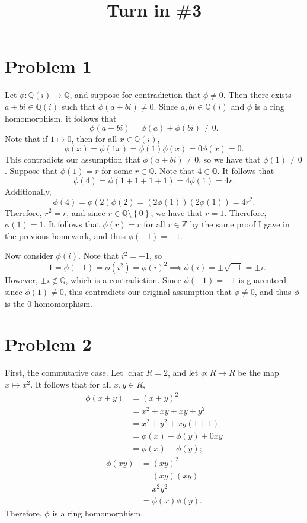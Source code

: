 \documentclass[11pt, letterpaper]{article}
\title{Turn in \#3}
\begin{document}
\makeproblem
\section*{Problem 1}
Let $\phi : \mathbb{Q} (i) \to \mathbb{Q} $, and suppose for contradiction that $\phi \neq 0$. Then there exists $a+bi\in\mathbb{Q}(i)$ such that $\phi (a+bi)\neq 0$. Since $a,bi\in\mathbb{Q} (i)$ and $\phi $ is a ring homomorphism, it follows that
\[
	\phi (a+bi)=\phi (a)+\phi (bi)\neq 0
.\]
Note that if $1\mapsto 0$, then for all $x\in\mathbb{Q} (i)$,
\[
	\phi (x)=\phi (1x)=\phi (1)\phi (x)=0\phi (x)=0
.\]
This contradicts our assumption that $\phi (a+bi)\neq 0$, so we have that $\phi (1)\neq 0$. Suppose that $\phi (1)=r$ for some $r\in\mathbb{Q} $. Note that $4\in\mathbb{Q} $. It follows that
\[
	\phi (4)=\phi (1+1+1+1)=4\phi (1)=4r
.\]
Additionally,
\[
	\phi (4)=\phi (2)\phi (2)=(2\phi (1))(2\phi (1))=4r^2
.\]
Therefore, $r^2=r$, and since $r\in\mathbb{Q} \setminus \left\{ 0 \right\} $, we have that $r=1$. Therefore, $\phi (1)=1$. It follows that $\phi (r)=r$ for all $r\in\mathbb{Z} $ by the same proof I gave in the previous homework, and thus $\phi (-1)=-1$.

Now consider $\phi (i)$. Note that $i^2=-1$, so
\[
	-1=\phi (-1)=\phi (i^2)=\phi (i)^2\implies \phi (i)=\pm\sqrt{-1} =\pm i
.\]
However, $\pm i\notin \mathbb{Q} $, which is a contradiction. Since $\phi (-1)=-1$ is guarenteed since $\phi (1)\neq 0$, this contradicts our original assumption that $\phi \neq 0$, and thus $\phi $ is the 0 homomorphism.
\section*{Problem 2}
First, the commutative case. Let $\operatorname{char} R=2$, and let $\phi : R \to R$ be the map $x\mapsto x^2$. It follows that for all $x,y\in R$,
\begin{align*}
	\phi (x+y)&=(x+y)^2\\
		  &=x^2+xy+xy+y^2\\
		  &=x^2+y^2+xy(1+1)\\
		  &=\phi (x)+\phi (y)+0xy\\
		  &=\phi (x)+\phi (y)
;\end{align*}
\begin{align*}
	\phi (xy)&=(xy)^2\\
		 &=(xy)(xy)\\
		 &=x^2y^2\\
		 &=\phi (x)\phi (y)
.\end{align*}
Therefore, $\phi $ is a ring homomorphism.
\end{document}
